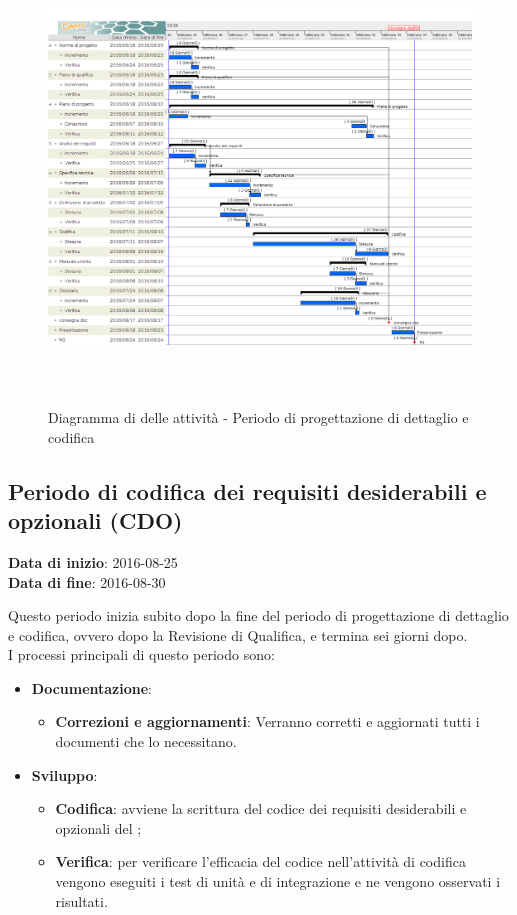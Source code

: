 		\begin{figure}[!h]
			\centering
			\includegraphics[height=12cm, width=15cm]{img/gantt/PDC} 
			\caption{Diagramma di  delle attività - Periodo di progettazione di dettaglio e codifica}
		\end{figure}
		
	\subsection{Periodo di codifica dei requisiti desiderabili e opzionali (CDO)}
	\begin{center}
		\textbf{Data di inizio}: 2016-08-25 \\
		\textbf{Data di fine}: 2016-08-30 \\
	\end{center}
	Questo periodo inizia subito dopo la fine del periodo di progettazione di dettaglio e codifica, ovvero dopo la Revisione di Qualifica, e termina sei giorni dopo. \\
	I processi principali di questo periodo sono: 
		\begin{itemize}
			\item \textbf{Documentazione}:
			\att
			\begin{itemize}
				\item \textbf{Correzioni e aggiornamenti}: Verranno corretti e aggiornati tutti i documenti che lo necessitano. 
			\end{itemize}
			\item \textbf{Sviluppo}:
			\att
			\begin{itemize}
				\item \textbf{Codifica}: avviene la scrittura del codice dei requisiti desiderabili e opzionali del ;
				\item \textbf{Verifica}: per verificare l'efficacia del codice  nell'attività di codifica vengono eseguiti i test di unità e di integrazione e ne vengono osservati i risultati. 
			\end{itemize}
		\end{itemize}
